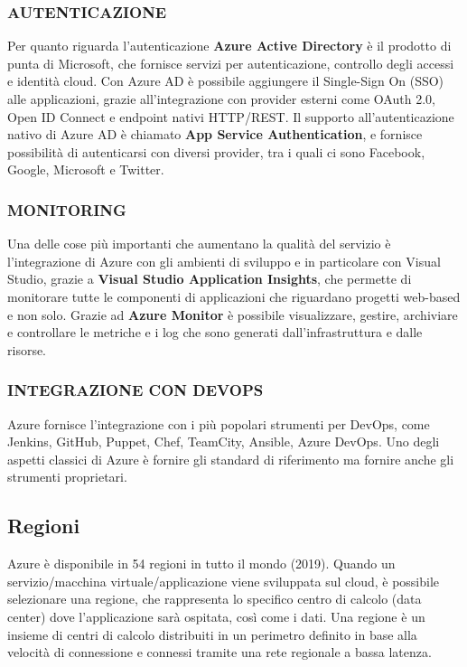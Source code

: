 \subsubsection{\textbf{AUTENTICAZIONE}}
Per quanto riguarda l'autenticazione \textbf{Azure Active Directory} è il prodotto di punta di Microsoft, che fornisce servizi per autenticazione, controllo degli accessi e identità cloud. Con Azure AD è possibile aggiungere il Single-Sign On (SSO) alle applicazioni, grazie all'integrazione con provider esterni come OAuth 2.0, Open ID Connect e endpoint nativi HTTP/REST. Il supporto all'autenticazione nativo di Azure AD è chiamato \textbf{App Service Authentication}, e fornisce possibilità di autenticarsi con diversi provider, tra i quali ci sono Facebook, Google, Microsoft e Twitter. 

\subsubsection{\textbf{MONITORING}}
Una delle cose più importanti che aumentano la qualità del servizio è l'integrazione di Azure con gli ambienti di sviluppo e in particolare con Visual Studio, grazie a \textbf{Visual Studio Application Insights}, che permette di monitorare tutte le componenti di applicazioni che riguardano progetti web-based e non solo. Grazie ad \textbf{Azure Monitor} è possibile visualizzare, gestire, archiviare e controllare le metriche e i log che sono generati dall'infrastruttura e dalle risorse. 

\subsubsection{\textbf{INTEGRAZIONE CON DEVOPS}}
Azure fornisce l'integrazione con i più popolari strumenti per DevOps, come Jenkins, GitHub, Puppet, Chef, TeamCity, Ansible, Azure DevOps. Uno degli aspetti classici di Azure è fornire gli standard di riferimento ma fornire anche gli strumenti proprietari. 

\subsection{Regioni}
Azure è disponibile in 54 regioni in tutto il mondo (2019). Quando un servizio/macchina virtuale/applicazione viene sviluppata sul cloud, è possibile selezionare una regione, che rappresenta lo specifico centro di calcolo (data center) dove l'applicazione sarà ospitata, così come i dati. Una regione è un insieme di centri di calcolo distribuiti in un perimetro definito in base alla velocità di connessione e connessi tramite una rete regionale a bassa latenza.

